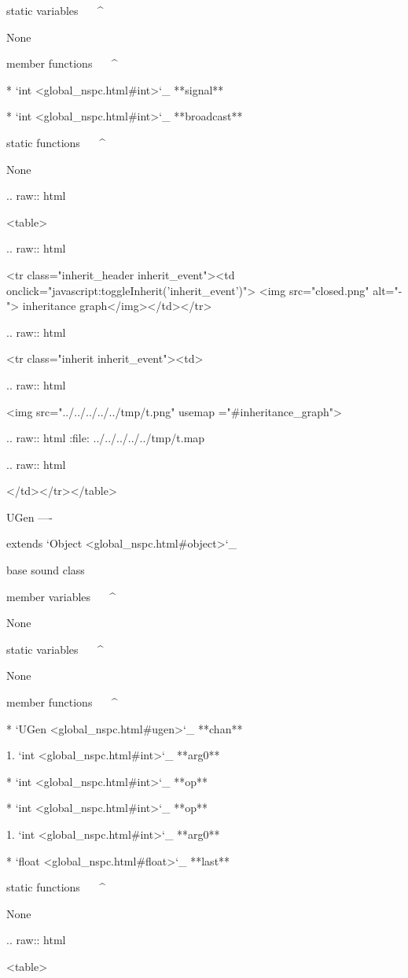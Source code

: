 static variables
^^^^^^^^^^^^^^^^

	None

member functions
^^^^^^^^^^^^^^^^

	* `int <global_nspc.html#int>`_ **signal**

	* `int <global_nspc.html#int>`_ **broadcast**

static functions
^^^^^^^^^^^^^^^^


	None


  .. raw:: html

   <table>


  .. raw:: html

   <tr class="inherit_header inherit_event"><td onclick="javascript:toggleInherit('inherit_event')"> <img src="closed.png" alt="-"> inheritance graph</img></td></tr>


  .. raw:: html

   <tr class="inherit inherit_event"><td>


  .. raw:: html

   <img src="../../../../../tmp/t.png" usemap ="#inheritance_graph">


  .. raw:: html
   :file:   ../../../../../tmp/t.map


  .. raw:: html

   </td></tr></table>

UGen
----

extends `Object <global_nspc.html#object>`_ 

base sound class

member variables
^^^^^^^^^^^^^^^^

	None

static variables
^^^^^^^^^^^^^^^^

	None

member functions
^^^^^^^^^^^^^^^^

	* `UGen <global_nspc.html#ugen>`_ **chan**

		1. `int <global_nspc.html#int>`_ **arg0**

	* `int <global_nspc.html#int>`_ **op**

	* `int <global_nspc.html#int>`_ **op**

		1. `int <global_nspc.html#int>`_ **arg0**

	* `float <global_nspc.html#float>`_ **last**

static functions
^^^^^^^^^^^^^^^^


	None


  .. raw:: html

   <table>


